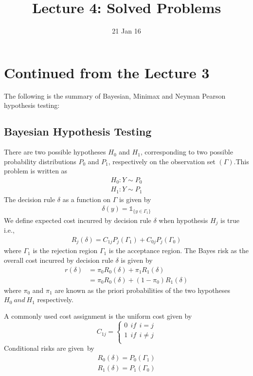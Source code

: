 \documentclass[a4paper,english,12pt]{article}
\title{Lecture 4: Solved Problems}
\date{21 Jan 16}
\begin{document}
\maketitle
  
\section{Continued from the Lecture 3}
The following is the summary of Bayesian, Minimax and Neyman Pearson hypothesis testing:
\subsection{Bayesian Hypothesis Testing}
There are two possible hypotheses $H_{0}$ and $H_{1}$, corresponding to two possible probability distributions $P_{0}$ and $P_{1}$, respectively on the observation set $(\Gamma)$.This problem is written as
\begin{eqnarray}
H_{0}:Y\sim P_{0}\\
H_{1}:Y\sim P_{1}
\end{eqnarray}
The decision rule $\delta$ as a function on $\Gamma$ is given by
\begin{eqnarray}
\delta(y)=\mathds{1}_{\{y\in\Gamma_{1}\}}
\end{eqnarray}
We define expected cost incurred by decision rule $\delta$ when hypothesis $H_{j}$ is true i.e.,
\begin{eqnarray}
R_{j}(\delta)= C_{1j}P_{j}(\Gamma_{1})+C_{0j}P_{j}(\Gamma_{0})
\end{eqnarray}
where $\Gamma_1$ is the rejection region $\Gamma_1$ is the  acceptance region.
The Bayes risk as the overall cost incurred by decision rule $\delta$ is given by
\begin{align}
r(\delta)&= \pi_{0}R_{0}(\delta)+\pi_{1}R_{1}(\delta)\nonumber\\
         &= \pi_{0}R_{0}(\delta)+(1-\pi_{0})R_{1}(\delta)
\end{align} 
where $\pi_{0}$ and $\pi_{1}$ are known as the priori probabilities of the two hypotheses $H_0~and~H_1$ respectively.

A commonly used cost assignment is the uniform cost given by
\begin{equation}
C_{1j}= 
		\begin{cases}
		0~~if~~i=j\\
		1~~if~~i\neq j\\
		\end{cases}
\end{equation}
Conditional risks are given~by
\begin{eqnarray}		
  R_{0}(\delta)=P_{0}(\Gamma_{1})\nonumber\\
  R_{1}(\delta)=P_{1}(\Gamma_{0})\nonumber     
\end{eqnarray}
\end{document}
